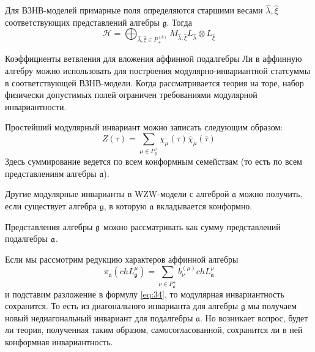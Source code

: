 Для ВЗНВ-моделей примарные поля определяются старшими весами  $\hat \lambda, \hat \xi$ соответствующих представлений алгебры $\mathfrak{g}$. Тогда
\begin{equation}
  \label{eq:76}\mathcal{H}=\bigoplus_{\hat \lambda,\hat \xi\in P^{(k)}_{+}}M_{\hat \lambda,\hat \xi}
L_{\hat \lambda}\otimes L_{\hat \xi}
\end{equation}

Коэффициенты ветвления для вложения аффинной подалгебры Ли в аффинную алгебру можно использовать для
построения модулярно-инвариантной статсуммы в соответствующей ВЗНВ-модели. Когда рассматривается
теория на торе,  набор физически допустимых полей ограничен требованиями модулярной инвариантности.

Простейший модулярный инвариант можно записать следующим образом:
\begin{equation}
  \label{eq:34}
   Z(\tau)=\sum_{ \mu\in P^{+}_{\mathfrak{g}}} \chi_{\mu}(\tau)\bar \chi_{\mu}(\bar \tau)
\end{equation}
Здесь суммирование ведется по всем конформным семействам (то есть по всем представлениям алгебры
$\mathfrak{a}$).

Другие модулярные инварианты в WZW-модели с алгеброй $\mathfrak{a}$ можно получить, если существует
алгебра $\mathfrak{g}$, в которую $\mathfrak{a}$ вкладывается конформно.  

Представления алгебры $\mathfrak{g}$ можно рассматривать как сумму представлений подалгебры $\mathfrak{a}$. 

Если мы рассмотрим редукцию характеров аффинной алгебры
\begin{equation}
  \label{eq:8}
   \pi_{\mathfrak{a}}(ch L^{\mu}_{\mathfrak{g}})=
  \sum_{\nu\in P^{+}_{\mathfrak{a}}}b^{(\mu)}_{\nu} ch L^{\nu}_{\mathfrak{a}}
\end{equation}
и подставим разложение в формулу \eqref{eq:34}, то модулярная инвариантность сохранится. То есть из
диагонального инварианта для алгебры $\mathfrak{g}$ мы получаем новый недиагональный инвариант для
подалгебры $\mathfrak{a}$. Но возникает вопрос, будет ли теория, полученная таким образом, самосогласованной, сохранится ли в
ней конформная инвариантность.

